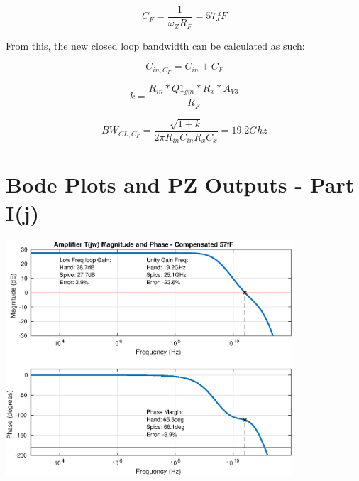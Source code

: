\documentclass[12pt,a4paper]{article}
\begin{document}
\begin{equation}
  C_F = \frac{1}{\omega_Z R_F} = 57fF
\end{equation}

From this, the new closed loop bandwidth can be calculated as such:

\begin{equation}
  C_{in,C_F} = C_{in} + C_F
\end{equation}

\begin{equation}
  k = \frac{R_{in} * Q1_{gm} * R_x * A_{V3}}{R_F}
\end{equation}

\begin{equation}
  BW_{CL,C_F} = \frac{\sqrt{1 + k}}{2 \pi R_{in} C_{in} R_x C_x} = 19.2Ghz
\end{equation}

\pagebreak




\section{Bode Plots and PZ Outputs - Part I(j)}

{\centering
	\includegraphics[width=0.8\textwidth]{plots/part_j_t.eps}
\par}

\pagebreak
\end{document}
